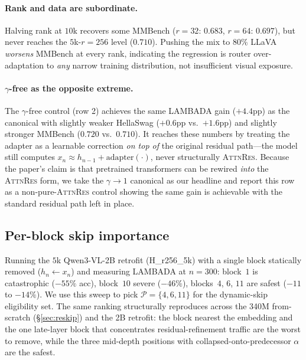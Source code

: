 \documentclass{article}
\newcommand{\attnres}{\textsc{AttnRes}}
\begin{document}
\paragraph{Rank and data are subordinate.} Halving rank at $10$k recovers some MMBench ($r{=}32$: $0.683$, $r{=}64$: $0.697$), but never reaches the $5$k-$r{=}256$ level ($0.710$). Pushing the mix to $80\%$ LLaVA \emph{worsens} MMBench at every rank, indicating the regression is router over-adaptation to \emph{any} narrow training distribution, not insufficient visual exposure.

\paragraph{$\gamma$-free as the opposite extreme.} The $\gamma$-free control (row 2) achieves the same LAMBADA gain ($+4.4$pp) as the canonical with slightly weaker HellaSwag ($+0.6$pp vs.\ $+1.6$pp) and slightly stronger MMBench ($0.720$ vs.\ $0.710$). It reaches these numbers by treating the adapter as a learnable correction \emph{on top of} the original residual path---the model still computes $x_n \approx h_{n-1} + \mathrm{adapter}(\cdot)$, never structurally \attnres{}. Because the paper's claim is that pretrained transformers can be rewired \emph{into} the \attnres{} form, we take the $\gamma{\to}1$ canonical as our headline and report this row as a non-pure-\attnres{} control showing the same gain is achievable with the standard residual path left in place.

\subsection{Per-block skip importance}
\label{app:block_removal}
Running the $5$k Qwen3-VL-2B retrofit (H\_r256\_5k) with a single block statically removed ($h_n \leftarrow x_n$) and measuring LAMBADA at $n{=}300$: block~$1$ is catastrophic ($-55\%$ acc), block~$10$ severe ($-46\%$), blocks~$4$, $6$, $11$ are safest ($-11$ to $-14\%$). We use this sweep to pick $\mathcal{P}{=}\{4,6,11\}$ for the dynamic-skip eligibility set. The same ranking structurally reproduces across the 340M from-scratch (\S\ref{sec:reskip}) and the 2B retrofit: the block nearest the embedding and the one late-layer block that concentrates residual-refinement traffic are the worst to remove, while the three mid-depth positions with collapsed-onto-predecessor $\alpha$ are the safest.
\end{document}
